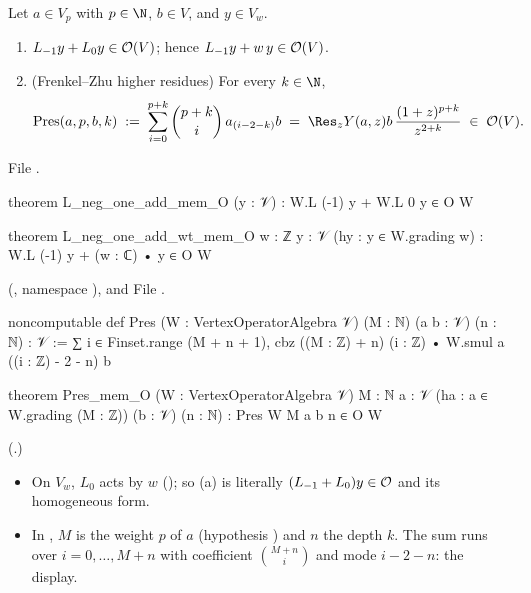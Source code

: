 \begin{lemma}\label{ch12:lem:Ocontents}
Let $a\in V_p$ with $p\in\N$, $b\in V$, and $y\in V_w$.
\begin{enumerate}[label=(\alph*)]
\item $L_{-1}y+L_0y\in\mathcal{O}(V)$; hence $L_{-1}y+w\,y\in\mathcal{O}(V)$.
\item (Frenkel--Zhu higher residues) For every $k\in\N$,
  \begin{equation*}
    \mathrm{Pres}(a,p,b,k)\;:=\;\sum_{i=0}^{p+k}\binom{p+k}{i}\,a_{(i-2-k)}b
    \;=\;\Res_zY(a,z)b\,\frac{(1+z)^{p+k}}{z^{2+k}}\;\in\;\chtwelveO(V).
  \end{equation*}
\end{enumerate}
\end{lemma}
File .
\begin{leancode}
theorem L_neg_one_add_mem_O (y : 𝒱) : W.L (-1) y + W.L 0 y ∈ O W

theorem L_neg_one_add_wt_mem_O {w : ℤ} {y : 𝒱} (hy : y ∈ W.grading w) :
    W.L (-1) y + (w : ℂ) • y ∈ O W
\end{leancode}
(, namespace ), and
File .
\begin{leancode}
noncomputable def Pres (W : VertexOperatorAlgebra 𝒱) (M : ℕ) (a b : 𝒱) (n : ℕ) : 𝒱 :=
  ∑ i ∈ Finset.range (M + n + 1), cbz ((M : ℤ) + n) (i : ℤ) • W.smul a ((i : ℤ) - 2 - n) b

theorem Pres_mem_O (W : VertexOperatorAlgebra 𝒱) {M : ℕ} {a : 𝒱}
    (ha : a ∈ W.grading (M : ℤ)) (b : 𝒱) (n : ℕ) : Pres W M a b n ∈ O W
\end{leancode}
(.)
\begin{dictionary}
\begin{itemize}
\item On $V_w$, $L_0$ acts by $w$ (); so (a) is literally
  $(L_{-1}+L_0)y\in\mathcal{O}$ and its homogeneous form.
\item In , $M$ is the weight $p$ of $a$ (hypothesis ) and $n$ the depth
  $k$.  The sum runs over $i=0,\dots,M+n$ with coefficient $\binom{M+n}{i}$ and mode $i-2-n$: the
  display.
\end{itemize}
\end{dictionary}

